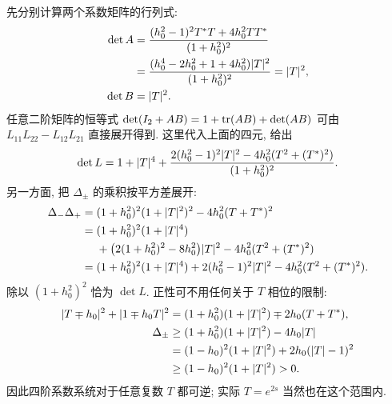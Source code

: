先分别计算两个系数矩阵的行列式:
\begin{equation*}
\begin{aligned}
\det A
&=\dfrac{(h_0^2-1)^2{T}^{*} T+4h_0^2T{T}^{*}}
{(1+h_0^2)^2}\\
&=\dfrac{(h_0^4-2h_0^2+1+4h_0^2)|T|^2}
{(1+h_0^2)^2}=|T|^2,\\
\det B&=|T|^2.
\end{aligned}
\end{equation*}
任意二阶矩阵的恒等式
$\det(I_2+ A B)
=1+\operatorname{tr}( A B)+\det( A B)$
可由 $L_{11}L_{22}-L_{12}L_{21}$ 直接展开得到.
这里代入上面的四元, 给出
\begin{equation*}
\det L
=1+|T|^4
+\dfrac{2(h_0^2-1)^2|T|^2
-4h_0^2(T^2+({T}^{*})^2)}{(1+h_0^2)^2}.
\end{equation*}
另一方面, 把 $\Delta_\pm$ 的乘积按平方差展开:
\begin{equation*}
\begin{aligned}
\Delta_-\Delta_+
={}&(1+h_0^2)^2(1+|T|^2)^2
-4h_0^2(T+{T}^{*})^2\\
={}&(1+h_0^2)^2(1+|T|^4)\\
&+\bigl(2(1+h_0^2)^2-8h_0^2\bigr)|T|^2
-4h_0^2(T^2+({T}^{*})^2)\\
={}&(1+h_0^2)^2(1+|T|^4)
+2(h_0^2-1)^2|T|^2
-4h_0^2(T^2+({T}^{*})^2).
\end{aligned}
\end{equation*}
除以 $(1+h_0^2)^2$ 恰为 $\det L$.
正性可不用任何关于 $T$ 相位的限制:
\begin{equation*}
\begin{aligned}
|T\mp h_0|^2+|1\mp h_0T|^2
&=(1+h_0^2)(1+|T|^2)
\mp2h_0(T+{T}^{*}),\\
\Delta_\pm
&\ge(1+h_0^2)(1+|T|^2)-4h_0|T|\\
&=(1-h_0)^2(1+|T|^2)
+2h_0(|T|-1)^2\\
&\ge(1-h_0)^2(1+|T|^2)>0.
\end{aligned}
\end{equation*}
因此四阶系数系统对于任意复数 $T$ 都可逆;
实际 $T=e^{2s}$ 当然也在这个范围内.

